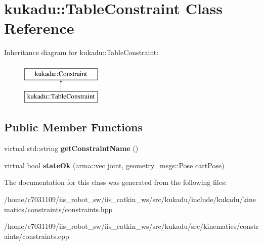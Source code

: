 \hypertarget{classkukadu_1_1TableConstraint}{\section{kukadu\-:\-:Table\-Constraint Class Reference}
\label{classkukadu_1_1TableConstraint}
}
Inheritance diagram for kukadu\-:\-:Table\-Constraint\-:\begin{figure}[H]
\begin{center}
\leavevmode
\includegraphics[height=2.000000cm]{classkukadu_1_1TableConstraint}
\end{center}
\end{figure}
\subsection*{Public Member Functions}
\begin{DoxyCompactItemize}
\item 
\hypertarget{classkukadu_1_1TableConstraint_ab7332b77e105b2f27ce8d4cead8264b7}{virtual std\-::string {\bfseries get\-Constraint\-Name} ()}\label{classkukadu_1_1TableConstraint_ab7332b77e105b2f27ce8d4cead8264b7}

\item 
\hypertarget{classkukadu_1_1TableConstraint_ac92cc0fa9c5cc5a9e978e936d89933d0}{virtual bool {\bfseries state\-Ok} (arma\-::vec joint, geometry\-\_\-msgs\-::\-Pose cart\-Pose)}\label{classkukadu_1_1TableConstraint_ac92cc0fa9c5cc5a9e978e936d89933d0}

\end{DoxyCompactItemize}


The documentation for this class was generated from the following files\-:\begin{DoxyCompactItemize}
\item 
/home/c7031109/iis\-\_\-robot\-\_\-sw/iis\-\_\-catkin\-\_\-ws/src/kukadu/include/kukadu/kinematics/constraints/constraints.\-hpp\item 
/home/c7031109/iis\-\_\-robot\-\_\-sw/iis\-\_\-catkin\-\_\-ws/src/kukadu/src/kinematics/constraints/constraints.\-cpp\end{DoxyCompactItemize}
